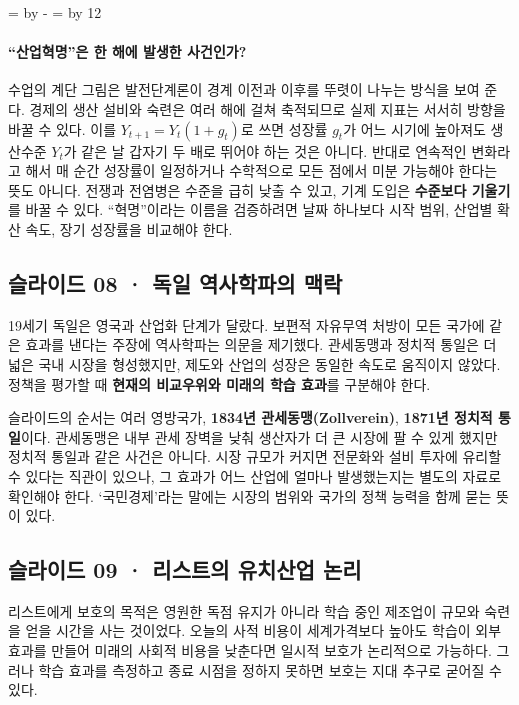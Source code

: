 \documentclass[10pt,a4paper]{article}
\newcommand{\ReserveQuestionSpace}{%
  \par\begingroup
  \dimen0=\pagegoal \advance\dimen0 by -\pagetotal
  \dimen2=\baselineskip \multiply\dimen2 by 12
  \ifdim\dimen0<\dimen2 \newpage\fi
  \endgroup}
\begin{document}
\ReserveQuestionSpace
\paragraph{“산업혁명”은 한 해에 발생한 사건인가?}

수업의 계단 그림은 발전단계론이 경계 이전과 이후를 뚜렷이 나누는 방식을 보여 준다. 경제의 생산 설비와 숙련은 여러 해에 걸쳐 축적되므로 실제 지표는 서서히 방향을 바꿀 수 있다. 이를 $Y_{t+1}=Y_t(1+g_t)$로 쓰면 성장률 $g_t$가 어느 시기에 높아져도 생산수준 $Y_t$가 같은 날 갑자기 두 배로 뛰어야 하는 것은 아니다. 반대로 연속적인 변화라고 해서 매 순간 성장률이 일정하거나 수학적으로 모든 점에서 미분 가능해야 한다는 뜻도 아니다. 전쟁과 전염병은 수준을 급히 낮출 수 있고, 기계 도입은 \textbf{수준보다 기울기}를 바꿀 수 있다. “혁명”이라는 이름을 검증하려면 날짜 하나보다 시작 범위, 산업별 확산 속도, 장기 성장률을 비교해야 한다.\par

\subsection{슬라이드 08 · 독일 역사학파의 맥락}
19세기 독일은 영국과 산업화 단계가 달랐다. 보편적 자유무역 처방이 모든 국가에 같은 효과를 낸다는 주장에 역사학파는 의문을 제기했다. 관세동맹과 정치적 통일은 더 넓은 국내 시장을 형성했지만, 제도와 산업의 성장은 동일한 속도로 움직이지 않았다. 정책을 평가할 때 \textbf{현재의 비교우위와 미래의 학습 효과}를 구분해야 한다.\par

슬라이드의 순서는 여러 영방국가, \textbf{1834년 관세동맹(Zollverein)}, \textbf{1871년 정치적 통일}이다. 관세동맹은 내부 관세 장벽을 낮춰 생산자가 더 큰 시장에 팔 수 있게 했지만 정치적 통일과 같은 사건은 아니다. 시장 규모가 커지면 전문화와 설비 투자에 유리할 수 있다는 직관이 있으나, 그 효과가 어느 산업에 얼마나 발생했는지는 별도의 자료로 확인해야 한다. ‘국민경제’라는 말에는 시장의 범위와 국가의 정책 능력을 함께 묻는 뜻이 있다.\par

\subsection{슬라이드 09 · 리스트의 유치산업 논리}
리스트에게 보호의 목적은 영원한 독점 유지가 아니라 학습 중인 제조업이 규모와 숙련을 얻을 시간을 사는 것이었다. 오늘의 사적 비용이 세계가격보다 높아도 학습이 외부효과를 만들어 미래의 사회적 비용을 낮춘다면 일시적 보호가 논리적으로 가능하다. 그러나 학습 효과를 측정하고 종료 시점을 정하지 못하면 보호는 지대 추구로 굳어질 수 있다.\par
\end{document}

